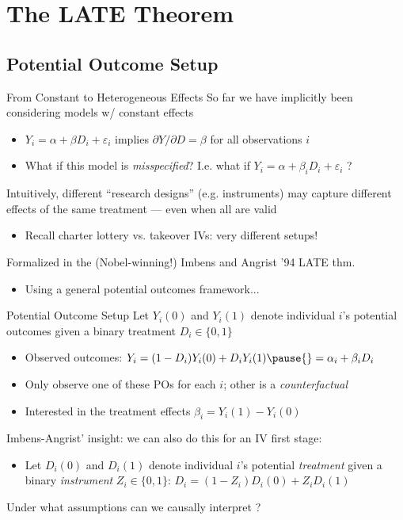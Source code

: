 \documentclass{beamer}
\begin{document}

\section{The LATE Theorem}

\subsection{Potential Outcome Setup}
\begin{frame}{From Constant to Heterogeneous Effects}
So far we have implicitly been considering models w/ constant effects
\begin{itemize}
\item $Y_i=\alpha+\beta D_i+\varepsilon_i$ implies $\partial Y/\partial D = \beta$ for all observations $i$\smallskip
\item What if this model is \emph{misspecified}? I.e. what if $Y_i=\alpha+\beta_i D_i+\varepsilon_i$ ?
\end{itemize}\medskip\pause{}
Intuitively, different ``research designs'' (e.g. instruments) may capture different effects of the same treatment --- even when all are valid\smallskip
\begin{itemize}
\item Recall charter lottery vs. takeover IVs: very different setups!
\end{itemize}\medskip\pause{}
Formalized in the (Nobel-winning!) Imbens and Angrist '94 LATE thm.\smallskip
\begin{itemize}
\item Using a general potential outcomes framework...
\end{itemize}
\end{frame}

\begin{frame}{Potential Outcome Setup}
Let $Y_i(0)$ and $Y_i(1)$ denote individual $i$'s potential outcomes given a binary treatment $D_i\in\{0,1\}$\smallskip
\begin{itemize}
\item Observed outcomes: $Y_i=(1-D_i)Y_i(0)+D_iY_i(1)\pause{}=\alpha_i+\beta_i D_i$\smallskip\pause{}
\item Only observe one of these POs for each $i$; other is a \emph{counterfactual}\smallskip
\item Interested in the treatment effects $\beta_i=Y_i(1)-Y_i(0)$
\end{itemize}\medskip\pause{}
Imbens-Angrist' insight: we can also do this for an IV first stage:\smallskip
\begin{itemize}
\item Let $D_i(0)$ and $D_i(1)$ denote individual $i$'s potential \emph{treatment} given a binary \emph{instrument} $Z_i\in\{0,1\}$:\pause{} $D_i=(1-Z_i)D_i(0)+Z_i D_i(1)$\smallskip
\end{itemize}\medskip\pause{}
Under what assumptions can we causally interpret ?
\end{frame}
\end{document}
